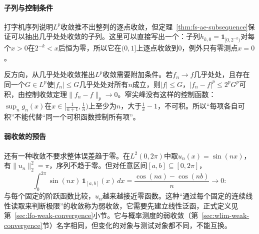 \paragraph{子列与控制条件}
打字机序列说明$L^p$收敛推不出整列的逐点收敛，但定理~\ref{thm:fs-ae-subsequence}保证可以抽出几乎处处收敛的子列。这里可以直接写出一个：子列$h_{k,0}=\mathbf 1_{[0,2^{-k})}$对每个$x>0$在$2^{-k}<x$后恒为零，所以它在$(0,1]$上逐点收敛到$0$，例外只有零测点$x=0$。

反方向，从几乎处处收敛推出$L^p$收敛需要附加条件。若$f_n\to f$几乎处处，且存在同一个$G\in L^p$使$|f_n|\leq G$几乎处处对所有$n$成立，则$|f|\leq G$，$|f_n-f|^p\leq2^pG^p$可积，由控制收敛定理$\|f_n-f\|_p\to0$。窄尖峰没有这样的控制函数：$\sup_ng_n(x)$在$x\in[\tfrac1{n+1},\tfrac1n)$上至少为$n$，大于$\tfrac1x-1$，不可积。所以“每项各自可积”不能代替“同一个可积函数控制所有项”。

\paragraph{弱收敛的预告}
还有一种收敛不要求整体误差趋于零。在$L^2(0,2\pi)$中取$u_n(x)=\sin(nx)$，有$\|u_n\|_2^2=\pi$，序列不趋于零。但对任意区间$[a,b]\subseteq[0,2\pi]$，
\[
 \int_0^{2\pi}\sin(nx)\,\mathbf 1_{[a,b]}(x)\,dx=\frac{\cos(na)-\cos(nb)}{n}\to0 :
\]
与每个固定的阶跃函数比较，$u_n$越来越接近零函数。这种“通过每个固定的连续线性读取来判断极限”的收敛称为弱收敛，它需要先建立线性泛函，正式定义见第~\ref{sec:lfo-weak-convergence}小节。它与概率测度的弱收敛（第~\ref{sec:wlim-weak-convergence}节）名字相同，但变化的对象与测试对象都不同，不能互换。

